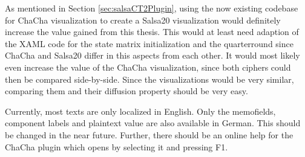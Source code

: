 \begin{description}[style=nextline]
As mentioned in Section \ref{sec:salsaCT2Plugin}, using the now existing codebase for ChaCha visualization to create a Salsa20 visualization would definitely increase the value gained from this thesis. This would at least need adaption of the XAML code for the state matrix initialization and the quarterround since ChaCha and Salsa20 differ in this aspects from each other. It would most likely even increase the value of the ChaCha visualization, since both ciphers could then be compared side-by-side. Since the visualizations would be very similar, comparing them and their diffusion property should be very easy.

\item[Localization and online help]

Currently, most texts are only localized in English. Only the memofields, component labels and plaintext value are also available in German. This should be changed in the near future. Further, there should be an online help for the ChaCha plugin which opens by selecting it and pressing F1.

\end{description}

